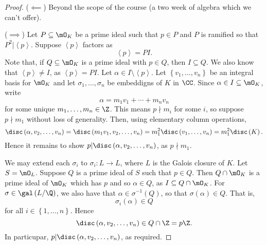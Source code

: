 \documentclass[pmath441]{subfiles}
\begin{document}
    \begin{proof}
        ($\impliedby$) Beyond the scope of the course (a two week of algebra which we can't offer).

        ($\implies$) Let $P\subseteq\mO_K$ be a prime ideal such that $p\in P$ and $P$ is ramified so that $P^{2}|\left< p \right>$. Suppose $\left< p \right>$ factors as
        \begin{equation*}
            \left< p \right> = PI. 
        \end{equation*}
        Note that, if $Q\subseteq\mO_K$ is a prime ideal with $p\in Q$, then $I\subseteq Q$. We also know that $\left< p \right>\neq I$, as $\left< p \right> = PI$. Let $\alpha\in I\setminus\left< p \right>$. Let $\left\lbrace v_1,\ldots,v_n \right\rbrace$ be an integral basis for $\mO_K$ and let $\sigma_1,\ldots,\sigma_n$ be embeddigns of $K$ in $\CC$. Since $\alpha\in I\subseteq\mO_K$, write
        \begin{equation*}
            \alpha = m_1v_1+\cdots+m_nv_n
        \end{equation*}
        for some unique $m_1,\ldots,m_n\in\Z$. This means $p\nmid m_i$ for some $i$, so suppose $p\nmid m_1$ without loss of generality. Then, using elementary column operations,
        \begin{equation*}
            \disc\left( \alpha,v_2,\ldots,v_n \right) = \disc\left( m_1v_1,v_2,\ldots,v_n \right) = m_1^{2}\disc\left( v_1,\ldots,v_n \right) = m_1^{2}\disc\left( K \right).
        \end{equation*}
        Hence it remains to show $p|\disc\left( \alpha,v_2,\ldots,v_n \right)$, as $p\nmid m_1$.

        We may extend each $\sigma_i$ to $\sigma_i:L\to L$, where $L$ is the Galois closure of $K$. Let $S=\mO_L$. Suppose $Q$ is a prime ideal of $S$ such that $p\in Q$. Then $Q\cap\mO_K$ is a prime ideal of $\mO_K$ which has $p$ and so $\alpha\in Q$, as $I\subseteq Q\cap\mO_K$. For $\sigma\in\gal\left( L /\Q \right)$, we also have that $\alpha\in\sigma^{-1}\left( Q \right)$, so that $\sigma\left( \alpha \right)\in Q$. That is,
        \begin{equation*}
            \sigma_i\left( \alpha \right)\in Q
        \end{equation*}
        for all $i\in\left\lbrace 1,\ldots,n \right\rbrace$. Hence
        \begin{equation*}
            \disc\left( \alpha,v_2,\ldots,v_n \right) \in Q\cap\Z = p\Z.
        \end{equation*}
        In particupar, $p|\disc\left( \alpha,v_2,\ldots,v_n \right)$, as required.
    \end{proof}
    
\end{document}
